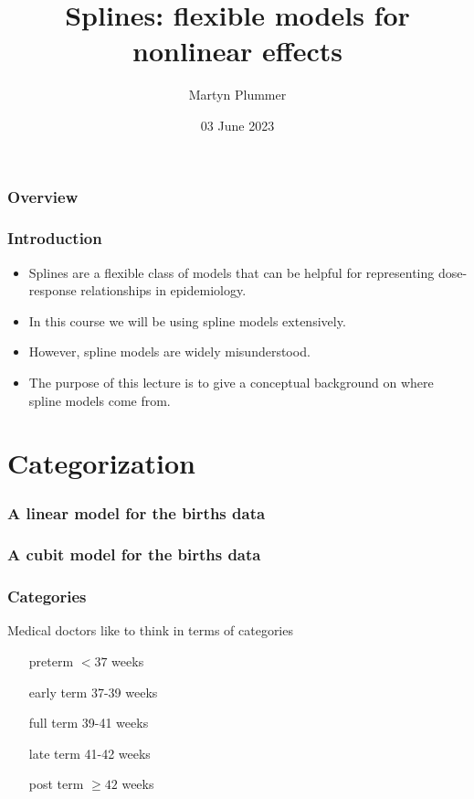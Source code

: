 \documentclass[aspectratio=169]{beamer}
\title{Splines: flexible models for nonlinear effects}
\author{Martyn Plummer}
\institute[Warwick] %
{
  University of Warwick
}
\date[Tartu]{03 June 2023}
\begin{document}
\begin{frame}[plain]
  \titlepage
\end{frame}

\begin{frame}
  \frametitle{Overview}
  \tableofcontents
\end{frame}

\begin{frame}
  \frametitle{Introduction}

  \begin{itemize}
  \item Splines are a flexible class of models that can be helpful for
    representing dose-response relationships in epidemiology.
  \item In this course we will be using spline models extensively.
  \item However, spline models are widely misunderstood.
  \item The purpose of this lecture is to give a conceptual background
    on where spline models come from.
  \end{itemize}
  
\end{frame}

\section{Categorization}

\begin{frame}
  \frametitle{A linear model for the births data}


\end{frame}

\begin{frame}
  \frametitle{A cubit model for the births data}

\end{frame}

\begin{frame}
  \frametitle{Categories}

  Medical doctors like to think in terms of categories
  \begin{itemize}
  \item[preterm] $<37$ weeks
  \item[early term] 37-39 weeks
  \item[full term] 39-41 weeks
  \item[late term] 41-42 weeks
  \item[post term] $\geq 42$ weeks
  \end{itemize}

\end{frame}
\end{document}
